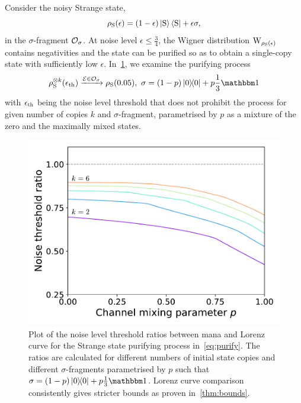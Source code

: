 \documentclass[pra,
aps,
twocolumn,
superscriptaddress,
groupedaddress,
nofootinbib,
reprint
]{revtex4-1}
\begin{document}
Consider the noisy Strange state,
\begin{equation}
    \rho_{\rm{S}}(\epsilon) = (1 - \epsilon) \ket{\rm{S}}\bra{\rm{S}} + \epsilon \sigma,
\end{equation}
in the $\sigma$-fragment $\mathcal{O}_\sigma$.
At noise level $\epsilon \leq \frac{3}{4}$, the Wigner distribution $\W{\rho_{\rm{S}}(\epsilon)}$ contains negativities and the state can be purified so as to obtain a single-copy state with sufficiently low $\epsilon$.
In~\cref{fig:distill}, we examine the purifying process 
\begin{equation}\label{eq:purify}
    \rho_{\rm{S}}^{\otimes k}(\epsilon_{\rm{th}}) \xrightarrow{\E \in \O_\sigma} \rho_{\rm{S}}(0.05),\ \sigma = (1-p)\ketbra{0} + p \frac{1}{3}\id
\end{equation}
with $\epsilon_{\rm{th}}$ being the noise level threshold that does not prohibit the process for given number of copies $k$ and $\sigma$-fragment, parametrised by $p$ as a mixture of the zero and the maximally mixed states.
\begin{figure}
    \centering
    \includegraphics[scale=0.5]{figs/ratios.pdf}
    \caption{Plot of the noise level threshold ratios between mana and Lorenz curve for the Strange state purifying process in~\cref{eq:purify}.
    The ratios are calculated for different numbers of initial state copies and different $\sigma$-fragments parametrised by $p$ such that $\sigma = (1-p)\ketbra{0} + p \frac{1}{3}\id$.
    Lorenz curve comparison consistently gives stricter bounds as proven in~\cref{thm:bounds}.
    }
    \label{fig:distill}
\end{figure}
\end{document}
